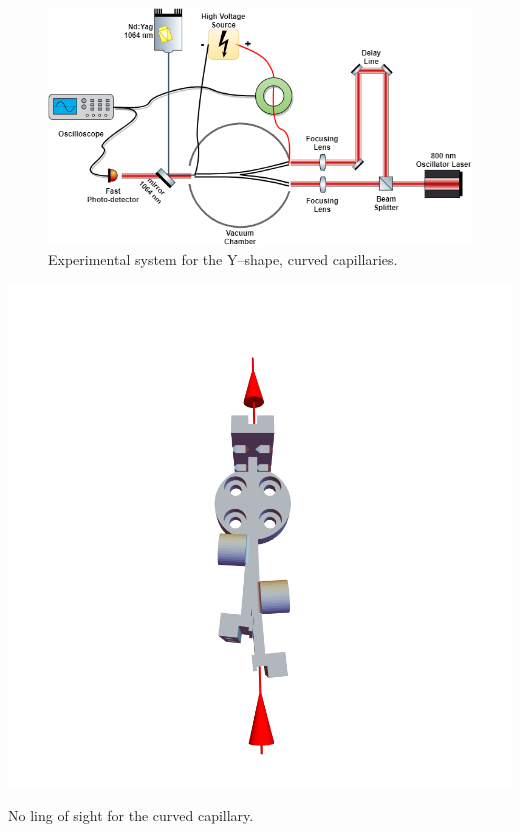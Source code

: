 \documentclass[../main.tex]{subfiles}
\begin{document}
\begin{figure}
    \centering
    \includegraphics[width=\textwidth]{figures/Curved capillaries/system double capillary.png}
    \caption{Experimental system for the Y--shape, curved capillaries.}
    \label{fig:twostage_system}
\end{figure}

\begin{marginfigure}
\includegraphics[width=\marginparwidth]{figures/Curved capillaries/line-of-sight.png}
\caption{No ling of sight for the curved capillary.}
\label{fig:lineofsight}
\end{marginfigure}
\end{document}
